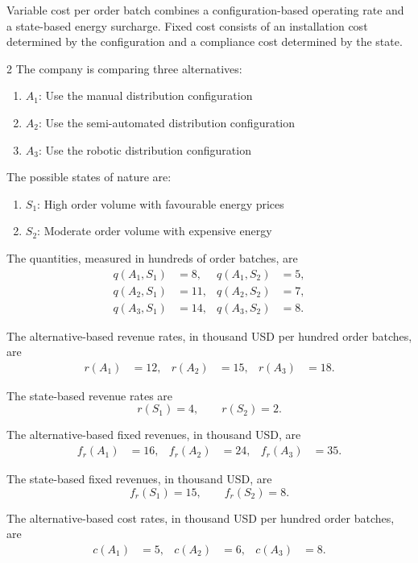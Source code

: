 Variable cost per order batch combines a configuration-based operating rate and
a state-based energy surcharge. Fixed cost consists of an installation cost
determined by the configuration and a compliance cost determined by the state.

\begin{multicols}{2}
	The company is comparing three alternatives:
	\begin{enumerate}[label=\arabic*.]
		\item \(A_1\): Use the manual distribution configuration
		\item \(A_2\): Use the semi-automated distribution configuration
		\item \(A_3\): Use the robotic distribution configuration
	\end{enumerate}
	
	The possible states of nature are:
	\begin{enumerate}[label=\arabic*.]
		\item \(S_1\): High order volume with favourable energy prices
		\item \(S_2\): Moderate order volume with expensive energy
	\end{enumerate}
	
	The quantities, measured in hundreds of order batches, are
	\[
	\begin{aligned}
		q(A_1,S_1)&=8,
		&
		q(A_1,S_2)&=5,
		\\
		q(A_2,S_1)&=11,
		&
		q(A_2,S_2)&=7,
		\\
		q(A_3,S_1)&=14,
		&
		q(A_3,S_2)&=8.
	\end{aligned}
	\]
	
	The alternative-based revenue rates, in thousand USD per hundred
	order batches, are
	\[
	\begin{aligned}
		r(A_1)&=12,
		&
		r(A_2)&=15,
		&
		r(A_3)&=18.
	\end{aligned}
	\]
	
	The state-based revenue rates are
	\[
	r(S_1)=4,
	\qquad
	r(S_2)=2.
	\]
	
	\columnbreak
	
	The alternative-based fixed revenues, in thousand USD, are
	\[
	\begin{aligned}
		f_r(A_1)&=16,
		&
		f_r(A_2)&=24,
		&
		f_r(A_3)&=35.
	\end{aligned}
	\]
	
	The state-based fixed revenues, in thousand USD, are
	\[
	f_r(S_1)=15,
	\qquad
	f_r(S_2)=8.
	\]
	
	The alternative-based cost rates, in thousand USD per hundred
	order batches, are
	\[
	\begin{aligned}
		c(A_1)&=5,
		&
		c(A_2)&=6,
		&
		c(A_3)&=8.
	\end{aligned}
	\]
	

\end{multicols}
